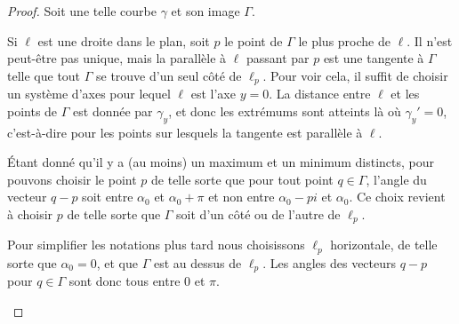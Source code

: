 \begin{proof}
	Soit une telle courbe \( \gamma\) et son image \( \Gamma\).
	\begin{subproof}

		Si \( \ell\) est une droite dans le plan, soit \( p\) le point de \( \Gamma\) le plus proche de \( \ell\). Il n'est peut-être pas unique, mais la parallèle à \( \ell\) passant par \( p\) est une tangente à \( \Gamma\) telle que tout \( \Gamma\) se trouve d'un seul côté de \( \ell_p\). Pour voir cela, il suffit de choisir un système d'axes pour lequel \( \ell\) est l'axe \( y=0\). La distance entre \( \ell\) et les points de \( \Gamma\) est donnée par \( \gamma_y\), et donc les extrémums sont atteints là où \( \gamma_y'=0\), c'est-à-dire pour les points sur lesquels la tangente est parallèle à \( \ell\).

		Étant donné qu'il y a (au moins) un maximum et un minimum distincts, pour pouvons choisir le point \( p\) de telle sorte que pour tout point \( q\in \Gamma\), l'angle du vecteur \( q-p\) soit entre \( \alpha_0\) et \( \alpha_0+\pi\) et non entre \( \alpha_0-pi\) et \( \alpha_0\). Ce choix revient à choisir \( p\) de telle sorte que \( \Gamma\) soit d'un côté ou de l'autre de \( \ell_p\).

		Pour simplifier les notations plus tard nous choisissons \( \ell_p\) horizontale, de telle sorte que \( \alpha_0=0\), et que \( \Gamma\) est au dessus de \( \ell_p\). Les angles des vecteurs \( q-p\) pour \( q\in \Gamma\) sont donc tous entre \( 0\) et \( \pi\).



\end{subproof}
\end{proof}
